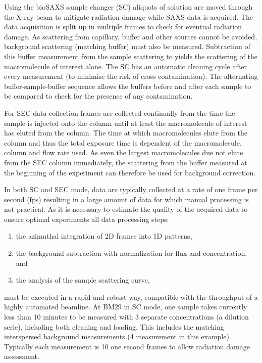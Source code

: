 \documentclass[preprint,pdf]{iucr}              %
\begin{document}
Using the bioSAXS sample changer (SC) aliquots of solution are moved through 
the X-ray beam to mitigate radiation damage while SAXS data is acquired. 
The data acquisition is split up in multiple frames to check for eventual radiation damage. 
As scattering from capillary, buffer and other sources cannot be avoided, 
background scattering (matching buffer) must also be measured. 
Subtraction of this  buffer measurement from the sample scattering to yields 
the scattering of the macromolecule of interest alone. 
The SC has an automatic cleaning cycle after every measurement 
(to minimise the risk of cross contamination). 
The alternating buffer-sample-buffer sequence allows the buffers before and 
after each sample to be compared to check for the presence of any contamination.

For SEC data collection frames are collected continually from the time the sample 
is injected onto the column until at least the macromolecule of interest has 
eluted from the column.
The time at which macromolecules  elute from the column and thus the total 
exposure time is dependent of the macromolecule,  column and flow rate used. 
As even the largest macromolecules due not elute from the SEC column immediately, 
the scattering from the buffer measured at the beginning of the experiment can 
therefore be used for background correction.

In both SC and SEC mode, data are typically collected at a rate of one frame per 
second (fps) resulting in a large amount of data for which manual processing is 
not practical. 
As it is necessary to estimate the quality of the acquired data to ensure optimal 
experiments all data processing steps:

\begin{enumerate}
\item the azimuthal integration of 2D frames into 1D patterns,
\item the background subtraction with normalization for flux and concentration,
and
\item the analysis of the sample scattering curve, 
\end{enumerate}
must be executed in a rapid and robust way, compatible with the throughput of a 
highly automated beamline. 
At BM29 in SC mode, one sample takes currently less than 10 minutes to
be measured with 3 separate concentrations (a dilution serie), including both
cleaning and loading. This includes the matching interspersed background
measurements (4 measurement in this example).
Typically each measurement is 10 one second frames to allow radiation damage
assessment.
\end{document}
